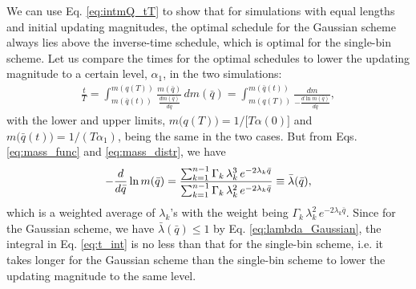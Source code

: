 \documentclass[reprint, superscriptaddress, floatfix]{revtex4-1}
\begin{document}
We can use Eq. \eqref{eq:intmQ_tT} to show that
for simulations with equal lengths and initial updating magnitudes,
the optimal schedule for the Gaussian scheme
always lies above the inverse-time schedule,
which is optimal for the single-bin scheme.
%
Let us compare the times for the optimal
schedules to lower the updating magnitude to a certain level,
$\alpha_1$,
in the two simulations:
%
\begin{align}
  \frac{t}{T}
  =
  \int_{m( \bar q(t) )}^{m( q(T) )}
  \!\!\frac{ m(\bar q) } { \frac{dm(\bar q)}{d\bar q} } \, d m(\bar q)
  =
  \int^{m( \bar q(t) )}_{m( q(T) )}
  \!\!\frac{ d m } { -\frac{d\ln m(\bar q)}{d\bar q} }
  ,
  \label{eq:t_int}
\end{align}
with the lower and upper limits,
$m\bigl(q(T)\bigr) = 1/\bigl[T\alpha(0)\bigr]$ and
$m\bigl(\bar q(t)\bigr) = 1/(T\alpha_1)$,
being the same in the two cases.
%
But from Eqs. \eqref{eq:mass_func} and \eqref{eq:mass_distr},
we have
\begin{align}
  -\frac{ d }{ d \bar q } \ln m(\bar q)
  =
  \frac{ \sum_{k=1}^{n-1} \Gamma_k \, \lambda_k^3 \, e^{-2\lambda_k \bar q} }
  { \sum_{k=1}^{n-1} \Gamma_k \, \lambda_k^2 \, e^{-2\lambda_k \bar q} }
  \equiv
  \bar\lambda(\bar q)
  ,
  \notag
\end{align}
which is a weighted average of $\lambda_k$'s
with the weight being $\Gamma_k \, \lambda_k^2 \, e^{-2\lambda_k \bar q}$.
%
Since for the Gaussian scheme,
we have $\bar \lambda(\bar q) \le 1$
by Eq. \eqref{eq:lambda_Gaussian},
the integral in Eq. \eqref{eq:t_int}
is no less than that for the single-bin scheme,
i.e. it takes longer for the Gaussian scheme
than the single-bin scheme
to lower the updating magnitude
to the same level.
\end{document}
